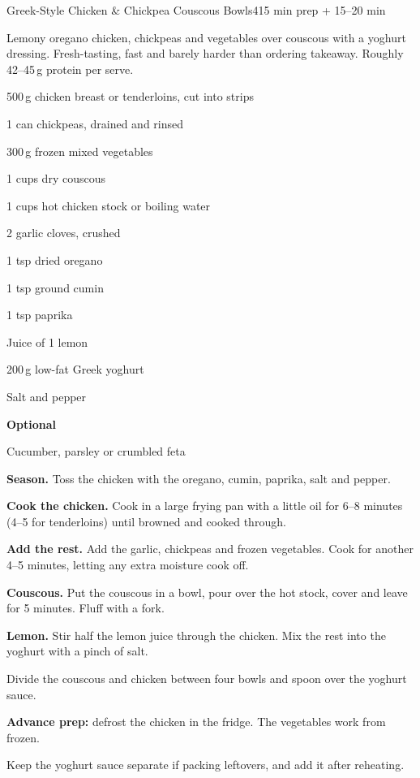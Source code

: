 \begin{recipebox}{Greek-Style Chicken \& Chickpea Couscous Bowls}{4}{15 min prep + 15--20 min}

Lemony oregano chicken, chickpeas and vegetables over couscous with a yoghurt
dressing. Fresh-tasting, fast and barely harder than ordering takeaway.
Roughly 42--45\,g protein per serve.

\begin{ingredients}
  \item 500\,g chicken breast or tenderloins, cut into strips
  \item 1 can chickpeas, drained and rinsed
  \item 300\,g frozen mixed vegetables
  \item 1 cups dry couscous
  \item 1 cups hot chicken stock or boiling water
  \item 2 garlic cloves, crushed
  \item 1 tsp dried oregano
  \item 1 tsp ground cumin
  \item 1 tsp paprika
  \item Juice of 1 lemon
  \item 200\,g low-fat Greek yoghurt
  \item Salt and pepper
  \item[] \textbf{Optional}
  \item Cucumber, parsley or crumbled feta
\end{ingredients}

\begin{method}
  \item \textbf{Season.} Toss the chicken with the oregano, cumin, paprika, salt and pepper.
  \item \textbf{Cook the chicken.} Cook in a large frying pan with a little oil for 6--8 minutes (4--5 for tenderloins) until browned and cooked through.
  \item \textbf{Add the rest.} Add the garlic, chickpeas and frozen vegetables. Cook for another 4--5 minutes, letting any extra moisture cook off.
  \item \textbf{Couscous.} Put the couscous in a bowl, pour over the hot stock, cover and leave for 5 minutes. Fluff with a fork.
  \item \textbf{Lemon.} Stir half the lemon juice through the chicken. Mix the rest into the yoghurt with a pinch of salt.
  \item Divide the couscous and chicken between four bowls and spoon over the yoghurt sauce.
\end{method}

\begin{notelist}
  \item \textbf{Advance prep:} defrost the chicken in the fridge. The vegetables work from frozen.
  \item Keep the yoghurt sauce separate if packing leftovers, and add it after reheating.
\end{notelist}

\end{recipebox}
